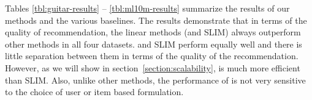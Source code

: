 
Tables \ref{tbl:guitar-results} -- \ref{tbl:ml10m-results} summarize the results of our methods and the various baselines.
The results demonstrate that in terms of the quality of recommendation, the linear methods (\LinearLow and SLIM) always outperform other methods
in all four datasets. \LinearLow and SLIM perform equally well and there is little separation between them in terms of the quality of
the recommendation. However, as we will show in section~\ref{section:scalability}, \LinearLow is much more efficient than SLIM.
Also, unlike other methods, the performance of \LinearLow is not very sensitive to the choice of user or item based formulation.

